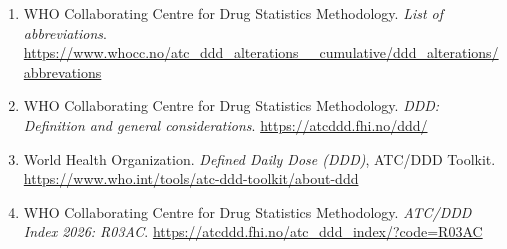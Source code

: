 \documentclass[10pt,twoside,xcolor=table,x11anmes]{IEEEtran}
\begin{document}
\begin{enumerate}
  \item WHO Collaborating Centre for Drug Statistics Methodology. \textit{List of abbreviations}. \url{https://www.whocc.no/atc_ddd_alterations__cumulative/ddd_alterations/abbrevations}

  \item WHO Collaborating Centre for Drug Statistics Methodology. \textit{DDD: Definition and general considerations}. \url{https://atcddd.fhi.no/ddd/}

  \item World Health Organization. \textit{Defined Daily Dose (DDD)}, ATC/DDD Toolkit. \url{https://www.who.int/tools/atc-ddd-toolkit/about-ddd}

  \item WHO Collaborating Centre for Drug Statistics Methodology. \textit{ATC/DDD Index 2026: R03AC}. \url{https://atcddd.fhi.no/atc_ddd_index/?code=R03AC}

  
  
\end{enumerate}
\end{document}
